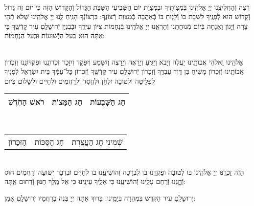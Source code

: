 \documentclass[twoside, openany, parskip=half, 11pt]{book}
\begin{document}
\vspace{-.25\baselineskip}
\begin{sometimes}

\shabbos\\
רְֿצֵה וְֿהַחֲלִיצֵֽנוּ יְיָ אֱלֹהֵֽינוּ בְּֿמִצְוֹתֶֽיךָ וּבְמִצְוַת יוֹם הַשְּֿׁבִיעִי הַשַּׁבָּת הַגָּדוֹל וְֿהַקָּדוֹשׁ הַזֶּה כִּי יוֹם זֶה גָּדוֹל וְֿקָדוֹשׁ הוּא לְֿפָנֶֽיךָ לִשְׁבָּת בּוֹ וְֿלָנֽוּחַ בּוֹ בְּֿאַהֲבָה כְּֿמִצְוַת רְֿצוֹנֶךָ: בִּרְצוֹנְֿךָ הָנִֽיחַ לָֽנוּ יְיָ אֱלֹהֵֽינוּ שֶׁלֹא תְֿהֵי צָרָה וְֿיָגוֹן וַאֲנָחָה בְּֿיוֹם מְֿנוּחָתֵֽנוּ וְֿהַרְאֵֽנוּ יְיָ אֱלֹהֵֽינוּ בְּֿנֶחָמוֹת צִיּוֹן עִירֶֽךָ וּבְֿבִנְיַן יְֿרוּשָׁלַֽםִ עִיר קָדְֿשֶֽׁךָ כִּי אַתָּה הוּא בַּֽעַל הַיְֿשׁוּעוֹת וּבַֽעַל הַנֶּחָמוֹת:


\sepline %

\vspace{-.25\baselineskip}
\\
אֱלֹהֵֽינוּ וֵאלֹהֵי אֲבוֹתֵֽינוּ יַעֲלֶה וְֿיָבֹא וְֿיַגִּיעַ וְֿיֵרָאֶה וְֿיֵרָצֶה וְֿיִשָּׁמַע וְֿיִפָּקֵד וְֿיִזָּכֵר זִכְרוֹנֵֽנוּ וּפִקְדּוֹנֵֽנוּ וְֿזִכְרוֹן אֲבוֹתֵֽינוּ וְֿזִכְרוֹן מָשִׁיחַ בֶּן דָּוִד עַבְדֶּֽךָ וְֿזִכְרוֹן יְֿרוּשָׁלַֽםִ עִיר קָדְֿשֶֽׁךָ וְֿזִכְרוֹן כׇּל־עַמְּֿךָ בֵּית יִשְׂרָאֵל לְֿפָנֶיךָ לִפְלֵיטָה וּלְטוֹבָה וּלְחֵן וּלְחֶֽסֶד וּלְרַחֲמִים וּלְחַיִּים וּלְשָׁלוֹם בְּֿיוֹם\\
\begin{tabular}{c|c|c}
רֹאשׁ הַחֹֽדֶשׁ & חַג הַמַּצוֹת & חַג הַשָּׁבֻעוֹת\\ \hline
\end{tabular}\\
\begin{tabular}{c|c|c}
הַזִּכָּרוֹן & חַג הַסֻּכּוֹת & שְֿׁמִינִי חַג הָעֲצֶֽרֶת
\end{tabular}\\
הַזֶּה זָכְֿרֵֽנּוּ יְיָ אֱלֹהֵֽינוּ בּוֹ לְֿטוֹבָה וּפָקְֿדֵֽנוּ בוֹ לִבְרָכָה וְֿהוֹשִׁיעֵֽנוּ בוֹ לְֿחַיִּים וּבִדְבַר יְֿשׁוּעָה וְֿרַחֲמִים חוּס וְֿחׇׇׇָנֵּנוּ וְֿרַחֵם עָלֵֽינוּ וְֿהוֹשִׁיעֵֽנוּ כִּי אֵלֶֽיךָ עֵינֵֽינוּ כִּי אֵל מֶֽלֶךְ חַנּוּן וְֿרַחוּם אַֽתָּה:

\end{sometimes}

יְֿרוּשָׁלַֽםִ עִיר הַקֹּֽדֶשׁ בִּמְהֵרָה בְּֿיָמֵֽינוּ: בָּרוּךְ אַתָּה יְיָ בֹּֽנֶה בְֿרַחֲמָיו יְֿרוּשָׁלָֽםִ אָמֵן:
\end{document}
